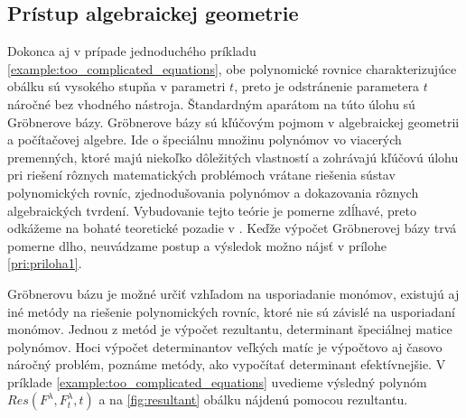 \subsection{Prístup algebraickej geometrie}
Dokonca aj v prípade jednoduchého príkladu \ref{example:too_complicated_equations}, obe polynomické rovnice charakterizujúce obálku sú vysokého stupňa v parametri $t$, preto je odstránenie parametera $t$ náročné bez vhodného nástroja. Štandardným aparátom na túto úlohu sú Gröbnerove bázy. Gröbnerove bázy sú kľúčovým pojmom v algebraickej geometrii a počítačovej algebre. Ide o špeciálnu množinu polynómov vo viacerých premenných, ktoré majú niekoľko dôležitých vlastností a zohrávajú kľúčovú úlohu pri riešení rôznych matematických problémoch vrátane riešenia sústav polynomických rovníc, zjednodušovania polynómov a dokazovania rôznych algebraických tvrdení. Vybudovanie tejto teórie je pomerne zdĺhavé, preto odkážeme na bohaté teoretické pozadie v \cite{Chalm}.
Keďže výpočet Gröbnerovej bázy trvá pomerne dlho, neuvádzame postup a výsledok možno nájsť v prílohe \ref{pri:priloha1}. 


Gröbnerovu bázu je možné určiť vzhľadom na usporiadanie monómov, existujú aj iné metódy na riešenie polynomických rovníc, ktoré nie sú závislé na usporiadaní monómov. Jednou z metód je výpočet rezultantu, determinant špeciálnej matice polynómov.
Hoci výpočet determinantov veľkých matíc je výpočtovo aj časovo náročný problém, poznáme metódy, ako vypočítať determinant efektívnejšie. V príklade \ref{example:too_complicated_equations} uvedieme výsledný polynóm $Res(F^\lambda , F_t^\lambda , t)$ a na \ref{fig:resultant} obálku nájdenú pomocou rezultantu. 


